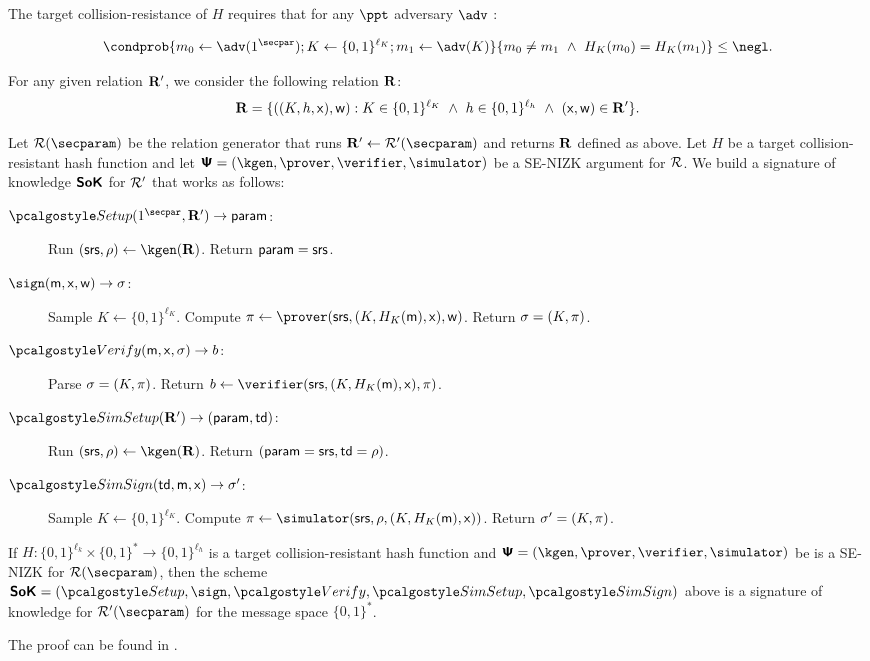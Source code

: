 The target collision-resistance of $H$ requires that for any $\ppt$ adversary $\adv$ : 
 
	\[  \condprob{
	m_0 \gets \adv(1^\secpar); K \gets \{0, 1\}^{\ell_K}; m_1 \gets \adv(K)
}{
	m_0 \neq m_1 ~\land  ~H_K(m_0)=H_K(m_1)
} \leq \negl.
	\]
	
For any given relation $\mathbf{R}'$, we consider the  following relation $\mathbf{R}$:
 	\[\mathbf{R}= \{((K,h,\mathsf{x}),\mathsf{w}) : K\in  \{0, 1\}^{\ell_K} ~\land ~h \in  \{0, 1\}^{\ell_h} ~\land ~(\mathsf{x}, \mathsf{w}) \in \mathbf{R}'\}.
 	\]
 	
Let $\RELGEN(\secparam)$ be the relation generator that runs $\REL' \gets \RELGEN'(\secparam)$ and returns $\mathbf{R}$ defined as above. 
Let $H$ be a target collision-resistant hash function and let $\ps = (\kgen, \prover, \verifier, \simulator)$ be a SE-NIZK argument for $\mathcal{R}$. 
We build a signature of knowledge  $\bm{\mathsf{SoK}}$ for $\mathcal{R}'$ that works as follows: 

\begin{description}
    \item[$\signsetup(1^\secpar, \REL') \rightarrow  \param$:]
 Run $(\srs,\rho) \leftarrow \kgen(\REL)$. 
 Return $ \mathsf{param} = \mathsf{srs}$.

    \item[$\sign(\mesage, \inp, \wit)  \rightarrow \signature$:]
Sample $K \gets \{0, 1\}^{\ell_K}$.  Compute
$\zkproof \gets  \prover(\srs, (K, H_K(\mesage), \inp), \wit) $.
Return $\mathsf{\sigma} = (K, \pi)$.

    \item[$\verify(\mesage, \inp, \signature) \rightarrow b$:]
Parse $\mathsf{\sigma} = (K, \pi)$.
Return $b \gets \verifier(\srs, (K, H_K(\mesage), \inp), \zkproof)$.
	
    \item[$\simsetup(\REL') \rightarrow (\param, \td)$:]
  Run   $(\srs,\rho) \leftarrow \kgen(\REL)$. 
 Return $( \mathsf{param} = \mathsf{srs},  \mathsf{td} = \rho)$.

    	
   \item[$\simsign(\td, \mesage, \inp) \rightarrow \signature'$:]
   Sample $K \gets \{0, 1\}^{\ell_K}$.  Compute
$\zkproof \gets \simulator(\srs, \rho, (K, H_K(\mesage), \inp)) $.
Return $\mathsf{\sigma}' = (K, \pi)$.

\end{description} 


\begin{theorem} 
  \label{thm:SoK}
If $H:\{0, 1\}^{\ell_k} \times \{0, 1\}^* \to \{0, 1\}^{\ell_h}$ is a target collision-resistant hash function 
and $\ps = (\kgen, \prover, \verifier, \simulator)$ be is a SE-NIZK for $\RELGEN(\secparam)$, then the scheme
 $\SoK = (\signsetup,  \sign, \allowbreak \verify,  \simsetup, \simsign)$ above is a signature of knowledge for $\RELGEN'(\secparam)$ for  the message space $\{0, 1\}^*$.
\end{theorem}
 The proof can be found in 
 \cite{C:GroMal17}.
	


